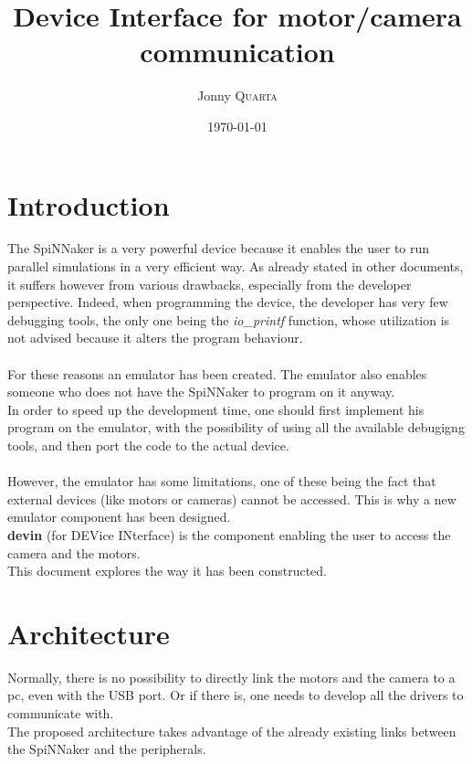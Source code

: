 \documentclass{article}
\title{\textbf{Device Interface for motor/camera communication}} %
\author{Jonny \textsc{Quarta}} %
\date{\today} %
\affil{Ecole Polytechnique Federale de Lausanne}
\begin{document}
\maketitle %

\tableofcontents

\section{Introduction}
The SpiNNaker is a very powerful device because it enables the user to run parallel simulations in a very efficient way. As already stated in other documents, it suffers however from various drawbacks, especially from the developer perspective. Indeed, when programming the device, the developer has very few debugging tools, the only one being the \textit{io\_printf} function, whose utilization is not advised because it alters the program behaviour. \\ \\

For these reasons an emulator has been created. The emulator also enables someone who does not have the SpiNNaker to program on it anyway.\\
In order to speed up the development time, one should first implement his program on the emulator, with the possibility of using all the available debugigng tools, and then port the code to the actual device.\\ \\

However, the emulator has some limitations, one of these being the fact that external devices (like motors or cameras) cannot be accessed. This is why a new emulator component has been designed.\\
\textbf{devin} (for DEVice INterface) is the component enabling the user to access the camera and the motors.\\
This document explores the way it has been constructed.

\section{Architecture}
Normally, there is no possibility to directly link the motors and the camera to a pc, even with the USB port. Or if there is, one needs to develop all the drivers to communicate with. \\
The proposed architecture takes advantage of the already existing links between the SpiNNaker and the peripherals.\\
\end{document}
